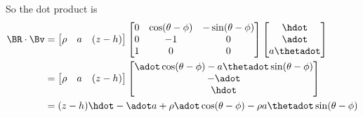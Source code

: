 So the dot product is
\begin{align*}
\BR \cdot \Bv 
&=
\begin{bmatrix}
\rho &
a & 
(z - h)
\end{bmatrix}
\begin{bmatrix}
0 & \cos(\theta-\phi)  & - \sin(\theta - \phi) \\
0 & - 1  & 0 \\
1 & 0 & 0 \\
\end{bmatrix}
\begin{bmatrix}
\hdot \\
\adot \\
a \thetadot
\end{bmatrix} \\
&=
\begin{bmatrix}
\rho &
a & 
(z - h)
\end{bmatrix}
\begin{bmatrix}
\adot \cos(\theta - \phi) - a \thetadot \sin(\theta - \phi) \\
- \adot \\
\hdot
\end{bmatrix} \\
&=
(z - h) \hdot - \adot a + \rho \adot \cos(\theta - \phi) - \rho a \thetadot \sin(\theta - \phi) 
\end{align*}

\EndNoBibArticle
